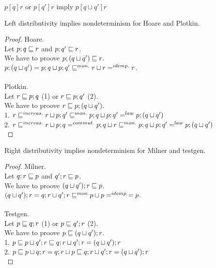 \documentclass{article}
\begin{document}
\begin{rul}
$p [q] r$ or $p [q'] r$ imply $p [q \sqcup q'] r$
\end{rul}

\begin{theorem}
Left distributivity implies nondeterminism for Hoare and Plotkin.
\end{theorem}

\begin{proof}
Hoare.\\
Let $p; q \sqsubseteq r$ and $p; q' \sqsubseteq r$.\\
We have to proove $p; (q \sqcup q') \sqsubseteq r$.\\
$p; (q \sqcup q') = p; q \sqcup p; q' \sqsubseteq^{mon.} r \sqcup r =^{idemp.} r$.\\
\\
Plotkin.\\
Let $r \sqsubseteq p; q$ (1) or $r \sqsubseteq p; q'$ (2).\\
We have to proove $r \sqsubseteq p; (q \sqcup q')$.\\
1. $r \sqsubseteq^{increas.} r \sqcup p; q' \sqsubseteq^{mon.} p; q \sqcup p; q' =^{law} p; (q \sqcup q')$\\
2. $r \sqsubseteq^{increas.} r \sqcup p; q =^{commut.} p; q \sqcup r \sqsubseteq^{mon.} p; q \sqcup p; q' =^{law} p; (q \sqcup q')$\\
\end{proof}

\begin{theorem}
Right distributivity implies nondeterminism for Milner and testgen.
\end{theorem}

\begin{proof}
Milner.\\
Let $q; r \sqsubseteq p$ and $q'; r \sqsubseteq p$.\\
We have to proove $(q \sqcup q'); r \sqsubseteq p$.\\
$(q \sqcup q'); r = q; r \sqcup q'; r \sqsubseteq^{mon} p \sqcup p =^{idemp.} = p$.\\
\\
Testgen.\\
Let $p \sqsubseteq q; r$ (1) or $p \sqsubseteq q'; r$ (2).\\
We have to proove $p \sqsubseteq (q \sqcup q'); r$.\\
1. $p \sqsubseteq p \sqcup q'; r \sqsubseteq q; r \sqcup q'; r = (q \sqcup q'); r$\\
2. $p \sqsubseteq p \sqcup q; r = q; r \sqcup p \sqsubseteq q; r \sqcup q'; r = (q \sqcup q'); r$\\
\end{proof}
\end{document}
